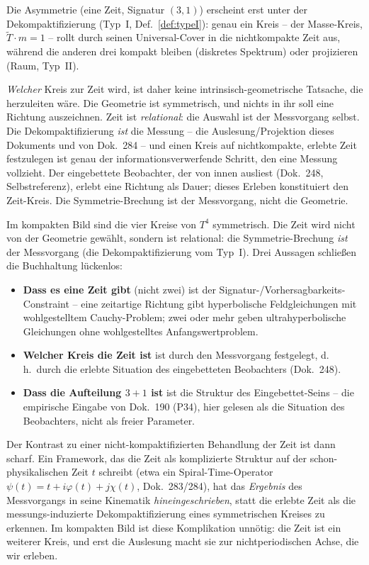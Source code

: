 Die Asymmetrie (eine Zeit, Signatur $(3,1)$) erscheint erst unter der
Dekompaktifizierung (Typ~I, Def.~\ref{def:typeI}): genau ein Kreis -- der
Masse-Kreis, $\tilde{T}\cdot m=1$ -- rollt durch seinen Universal-Cover in die
nichtkompakte Zeit aus, w\"ahrend die anderen drei kompakt bleiben (diskretes
Spektrum) oder projizieren (Raum, Typ~II).

\emph{Welcher} Kreis zur Zeit wird, ist daher keine intrinsisch-geometrische
Tatsache, die herzuleiten w\"are. Die Geometrie ist symmetrisch, und nichts in ihr
soll eine Richtung auszeichnen. Zeit ist \emph{relational}: die Auswahl ist der
Messvorgang selbst. Die Dekompaktifizierung \emph{ist} die Messung -- die
Auslesung/Projektion dieses Dokuments und von Dok.~284 -- und einen Kreis auf
nichtkompakte, erlebte Zeit festzulegen ist genau der informationsverwerfende
Schritt, den eine Messung vollzieht. Der eingebettete Beobachter, der von innen
ausliest (Dok.~248, Selbstreferenz), erlebt eine Richtung als Dauer; dieses Erleben
konstituiert den Zeit-Kreis. Die Symmetrie-Brechung ist der Messvorgang, nicht die
Geometrie.

\begin{principle}
Im kompakten Bild sind die vier Kreise von $T^4$ symmetrisch. Die Zeit wird nicht von
der Geometrie gew\"ahlt, sondern ist relational: die Symmetrie-Brechung \emph{ist} der
Messvorgang (die Dekompaktifizierung vom Typ~I). Drei Aussagen schlie{\ss}en die
Buchhaltung l\"uckenlos:
\begin{itemize}
  \item \textbf{Dass es eine Zeit gibt} (nicht zwei) ist der
  Signatur-/Vorhersagbarkeits-Constraint -- eine zeitartige Richtung gibt
  hyperbolische Feldgleichungen mit wohlgestelltem Cauchy-Problem; zwei oder mehr
  geben ultrahyperbolische Gleichungen ohne wohlgestelltes Anfangswertproblem.
  \item \textbf{Welcher Kreis die Zeit ist} ist durch den Messvorgang festgelegt,
  d.\,h.\ durch die erlebte Situation des eingebetteten Beobachters (Dok.~248).
  \item \textbf{Dass die Aufteilung $3{+}1$ ist} ist die Struktur des
  Eingebettet-Seins -- die empirische Eingabe von Dok.~190 (P34), hier gelesen als die
  Situation des Beobachters, nicht als freier Parameter.
\end{itemize}
\end{principle}

Der Kontrast zu einer nicht-kompaktifizierten Behandlung der Zeit ist dann scharf. Ein
Framework, das die Zeit als komplizierte Struktur auf der schon-physikalischen Zeit
$t$ schreibt (etwa ein Spiral-Time-Operator $\psi(t)=t+i\varphi(t)+j\chi(t)$,
Dok.~283/284), hat das \emph{Ergebnis} des Messvorgangs in seine Kinematik
\emph{hineingeschrieben}, statt die erlebte Zeit als die messungs-induzierte
Dekompaktifizierung eines symmetrischen Kreises zu erkennen. Im kompakten Bild ist
diese Komplikation unn\"otig: die Zeit ist ein weiterer Kreis, und erst die Auslesung
macht sie zur nichtperiodischen Achse, die wir erleben.


